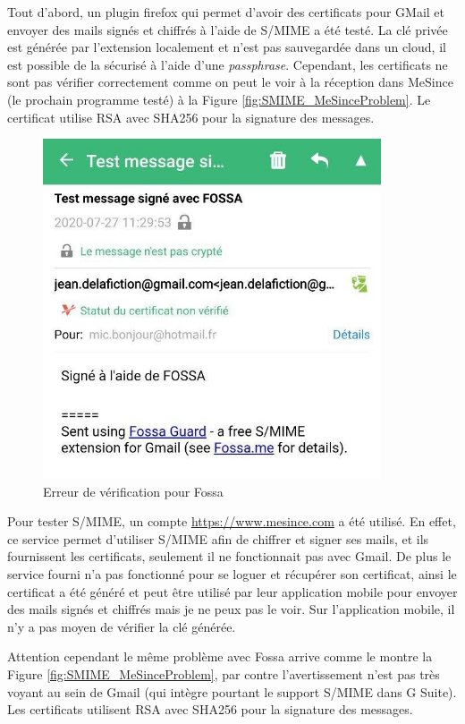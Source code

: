 Tout d'abord, un plugin firefox qui permet d'avoir des certificats pour GMail et envoyer des mails signés et chiffrés à l'aide de S/MIME a été testé. La clé privée est générée par l'extension localement et n'est pas sauvegardée dans un cloud, il est possible de la sécurisé à l'aide d'une \textit{passphrase}. Cependant, les certificats ne sont pas vérifier correctement comme on peut le voir à la réception dans MeSince (le prochain programme testé) à la Figure \ref{fig:SMIME_MeSinceProblem}. Le certificat utilise RSA avec SHA256 pour la signature des messages.
\begin{figure}[h!]
	\includegraphics[width=10cm]{images/SMIME_FossaProblem.jpg}
	\centering
	\caption{Erreur de vérification pour Fossa}
	\label{fig:SMIME_FossaProblem}
\end{figure}

Pour tester S/MIME, un compte \url{https://www.mesince.com} a été utilisé. En effet, ce service permet d'utiliser S/MIME afin de chiffrer et signer ses mails, et ils fournissent les certificats, seulement il ne fonctionnait pas avec Gmail. De plus le service fourni n'a pas fonctionné pour se loguer et récupérer son certificat, ainsi le certificat a été généré et peut être utilisé par leur application mobile pour envoyer des mails signés et chiffrés mais je ne peux pas le voir. Sur l'application mobile, il n'y a pas moyen de vérifier la clé générée.

Attention cependant le même problème avec Fossa arrive comme le montre la Figure \ref{fig:SMIME_MeSinceProblem}, par contre l'avertissement n'est pas très voyant au sein de Gmail (qui intègre pourtant le support S/MIME dans G Suite). Les certificats utilisent RSA avec SHA256 pour la signature des messages.

